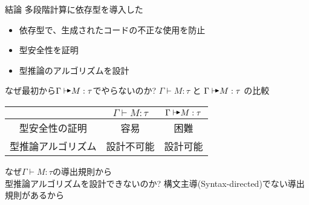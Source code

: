 \documentclass[dvipdfmx,aspectratio=169, 20pt]{beamer}
\renewcommand{\V}{\vdash}
\begin{document}
\begin{frame}[fragile]{結論}
    多段階計算に依存型を導入した
    \begin{itemize}
        \item 依存型で、生成されたコードの不正な使用を防止
        \item 型安全性を証明 
        \item 型推論のアルゴリズムを設計 
    \end{itemize}
\end{frame}


\begin{frame}{なぜ最初から$\Gamma \AV M : \tau$でやらないのか?}
    $\Gamma \vdash M : \tau$ と $\Gamma \AV M : \tau$ の比較 \\[5mm]
    \begin{tabular}{|c|c|c|} \hline
        & $\Gamma \vdash M : \tau$ & $\Gamma \AV M : \tau$ \\ \hline
        型安全性の証明 & 容易 & 困難 \\ \hline
        型推論アルゴリズム & 設計不可能 & 設計可能 \\ \hline
    \end{tabular}
\end{frame}

\begin{frame}{なぜ$\Gamma \V M : \tau$の導出規則から\\型推論アルゴリズムを設計できないのか?}
    構文主導(Syntax-directed)でない導出規則があるから
    \begin{center}
    {\footnotesize
        \infrule[\TConv]{\G\V M:\underline{\tau} @A \andalso \G\V \underline{\tau}\equiv \sigma :: K@A}{\G\V M:\sigma@A}
    }
    \end{center}
\end{frame}
\end{document}
